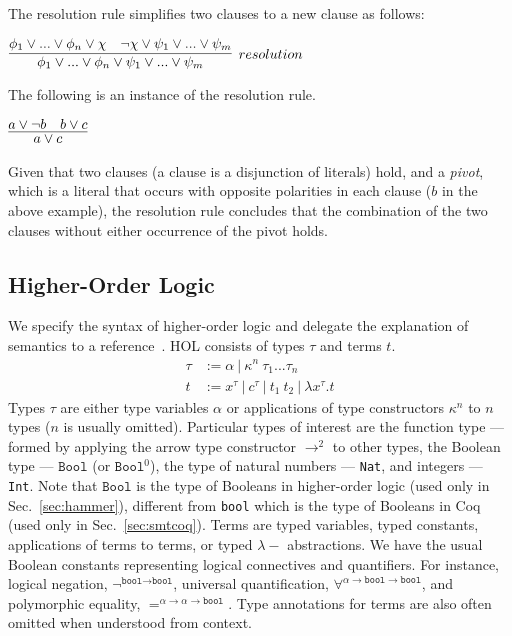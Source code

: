 \documentclass{article}
\begin{document}
	The resolution rule simplifies two 
	clauses to a new clause as follows:
	\begin{center}
		$\infer[resolution]{\phi_1 \lor ... \lor 
			\phi_n \lor \psi_1 \lor ... \lor 
			\psi_m}{\phi_1 \lor ... \lor \phi_n 
			\lor \chi & \neg \chi \lor \psi_1 
			\lor ... \lor \psi_m}$ 
	\end{center}
	The following is an instance of the 
	resolution rule.
	\begin{center}
		$\infer{a \lor c}{a \lor \neg b 
			& b \lor c}$
	\end{center}
	Given that two clauses (a clause 
	is a disjunction of literals) hold, 
	and a \textit{pivot}, which is a 
	literal that occurs with opposite 
	polarities in each clause ($b$ in 
	the above example), the resolution 
	rule concludes that 
	the combination of the two clauses 
	without either occurrence of the 
	pivot holds.
	
	\subsection{Higher-Order Logic}
	\label{sec:hol}
	We specify the 
	syntax of higher-order logic 
	and delegate the explanation of 
	semantics to a 
	reference~\cite{10.5555/155278}. 
	HOL consists of 
	types $\tau$ and terms $t$. 
	\begin{align*}
	\tau &:= \alpha\ |\ \kappa^n\ 
	\tau_1 ... \tau_n\\
	t &:= x^{\tau}\ |\ c^{\tau}\ |\ t_1\ t_2\ 
	|\ \lambda x^{\tau}.t
	\end{align*}	
	Types $\tau$ are either type
	variables $\alpha$ or 
	applications of type 
	constructors $\kappa^n$ to 
	$n$ types ($n$ is usually omitted). 
	Particular types of interest are 
	the function type --- formed by 
	applying the arrow type constructor 
	$\to^{2}$ to other types, the 
	Boolean type --- $\texttt{Bool}$ 
	(or $\texttt{Bool}^0$), the type of 
	natural numbers --- \texttt{Nat},
	and integers --- \texttt{Int}.
	Note that $\texttt{Bool}$ is the 
	type of Booleans in higher-order
	logic (used only in 
	Sec.~\ref{sec:hammer}), different
	from \texttt{bool} which is the 
	type of Booleans in Coq (used only 
	in Sec.~\ref{sec:smtcoq}).
	Terms are typed variables, 
	typed constants, applications 
	of terms to terms, or typed
	$\lambda-$ abstractions. We have
	the usual Boolean constants 
	representing logical connectives
	and quantifiers. For instance, 
	logical negation, 
	$\neg^{\texttt{bool} \to 
		\texttt{bool}}$, universal 
	quantification,
	$\forall^{\alpha \to 
		\texttt{bool} \to \texttt{bool}}$, 
	and polymorphic equality,
	$=^{\alpha \to \alpha 
		\to \texttt{bool}}$. Type 
	annotations for terms are also 
	often omitted when understood
	from context.
	
\end{document}
